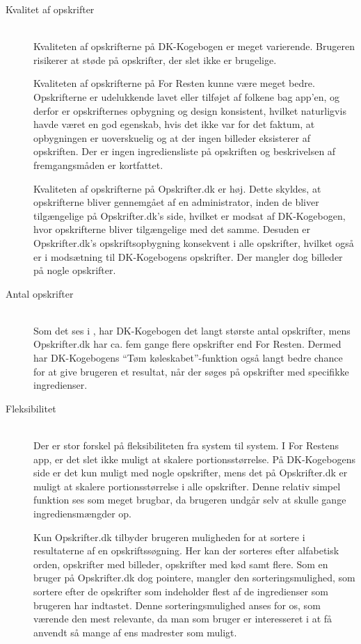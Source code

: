 \begin{description}
\item[Kvalitet af opskrifter] \hfill \\
Kvaliteten af opskrifterne på DK-Kogebogen er meget varierende. Brugeren risikerer at støde på opskrifter, der slet ikke er brugelige. 

Kvaliteten af opskrifterne på For Resten kunne være meget bedre. Opskrifterne er udelukkende lavet eller tilføjet af folkene bag app’en, og derfor er opskrifternes opbygning og design konsistent, hvilket naturligvis havde været en god egenskab, hvis det ikke var for det faktum, at opbygningen er uoverskuelig og at der ingen billeder eksisterer af opskriften. Der er ingen ingrediensliste på opskriften og beskrivelsen af fremgangsmåden er kortfattet. 

Kvaliteten af opskrifterne på Opskrifter.dk er høj. Dette skyldes, at opskrifterne bliver gennemgået af en administrator, inden de bliver tilgængelige på Opskrifter.dk’s side, hvilket er modsat af DK-Kogebogen, hvor opskrifterne bliver tilgængelige med det samme. Desuden er Opskrifter.dk’s opskriftsopbygning konsekvent i alle opskrifter, hvilket også er i modsætning til DK-Kogebogens opskrifter. Der mangler dog billeder på nogle opskrifter.

\item[Antal opskrifter] \hfill \\
Som det ses i , har DK-Kogebogen det langt største antal opskrifter, mens Opskrifter.dk har ca. fem gange flere opskrifter end For Resten. Dermed har DK-Kogebogens ``Tøm køleskabet''-funktion også langt bedre chance for at give brugeren et resultat, når der søges på opskrifter med specifikke ingredienser.

\item[Fleksibilitet] \hfill \\
Der er stor forskel på fleksibiliteten fra system til system. I For Restens app, er det slet ikke muligt at skalere portionsstørrelse. På DK-Kogebogens side er det kun muligt med nogle opskrifter, mens det på Opskrifter.dk er muligt at skalere portionsstørrelse i alle opskrifter. Denne relativ simpel funktion ses som meget brugbar, da brugeren undgår selv at skulle gange ingrediensmængder op.

Kun Opskrifter.dk tilbyder brugeren muligheden for at sortere i resultaterne af en opskriftssøgning. Her kan der sorteres efter alfabetisk orden, opskrifter med billeder, opskrifter med kød samt flere. Som en bruger på Opskrifter.dk dog pointere, mangler den sorteringsmulighed, som sortere efter de opskrifter som indeholder flest af de ingredienser som brugeren har indtastet. Denne sorteringsmulighed anses for os, som værende den mest relevante, da man som bruger er interesseret i at få anvendt så mange af ens madrester som muligt.


\end{description}
